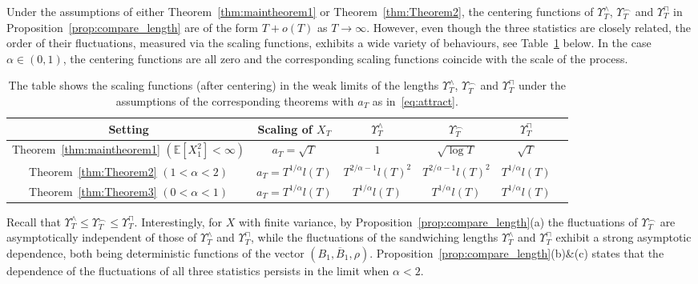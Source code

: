 \documentclass[10pt]{amsart}
\theoremstyle{definition}\newtheorem{defi}[theo]{Definition}\newtheorem{rema}[theo]{Remark}\newtheorem{exam}[theo]{Example}\newtheorem{exem}[theo]{Example}\newtheorem{nota}[theo]{Notation}
\newcommand\E{\mathds{E}}
\newcommand\1{\mathds{1}}
\newcommand\ov[1]{\overline{#1}}
\begin{document}
Under the assumptions of either Theorem~\ref{thm:maintheorem1} or Theorem~\ref{thm:Theorem2}, the centering functions of $\Upsilon_T^\wedge$, $\Upsilon_T^\frown$ and $\Upsilon_T^\sqcap$ in Proposition~\ref{prop:compare_length} are of the form $T+o(T)$ as $T\to\infty$. However, even though the three statistics are closely related, the order of their fluctuations, measured via the scaling functions, exhibits a wide variety of behaviours, see Table~\ref{tab:compare_length} below. In the case $\alpha\in(0,1)$, the centering functions are all zero and the corresponding scaling functions coincide with the scale of the process.

\begin{table}[ht]
\begin{tabular}{|c|c|c|c|c|c|}
\hline Setting & Scaling of $X_T$ & $\Upsilon_T^\wedge$ & $\Upsilon_T^\frown$ & $\Upsilon_T^\sqcap$\\[0.15em]
\hline Theorem~\ref{thm:maintheorem1} $(\E [X_1^2]<\infty)$ & $a_T=\sqrt{T}$ & $1$ & $\sqrt{\log T}$ & $\sqrt{T}$\\[0.15em]
\hline Theorem~\ref{thm:Theorem2} $(1<\alpha<2)$ & $a_T=T^{1/\alpha}l(T)$ & $T^{2/\alpha-1}l(T)^2$ & $T^{2/\alpha-1}l(T)^2$ & $T^{1/\alpha}l(T)$\\[0.15em]
\hline Theorem~\ref{thm:Theorem3} $(0<\alpha<1)$ & $a_T=T^{1/\alpha}l(T)$ & $T^{1/\alpha}l(T)$ & $T^{1/\alpha}l(T)$ & $T^{1/\alpha}l(T)$\\[0.15em]
\hline
\end{tabular}
\caption{The table shows the scaling functions (after centering) in the weak limits of the lengths $\Upsilon^\wedge_T$, $\Upsilon^\frown_T$ and $\Upsilon^\sqcap_T$ under the assumptions of the corresponding theorems with $a_T$ as in~\eqref{eq:attract}.}\label{tab:compare_length}
\end{table}

Recall that $\Upsilon_T^\wedge\le\Upsilon_T^\frown\le\Upsilon_T^\sqcap$. Interestingly, for $X$ with finite variance, by Proposition~\ref{prop:compare_length}(a) the fluctuations of $\Upsilon_T^\frown$ are asymptotically independent of those of $\Upsilon_T^\wedge$ and $\Upsilon_T^\sqcap$, while the fluctuations of the sandwiching lengths $\Upsilon_T^\wedge$ and $\Upsilon_T^\sqcap$ exhibit a strong asymptotic dependence, both being deterministic functions of the vector $(B_1,\ov B_1,\rho)$. Proposition~\ref{prop:compare_length}(b)\&(c) states that the dependence of the fluctuations of all three statistics persists in the limit when $\alpha<2$.
\end{document}
